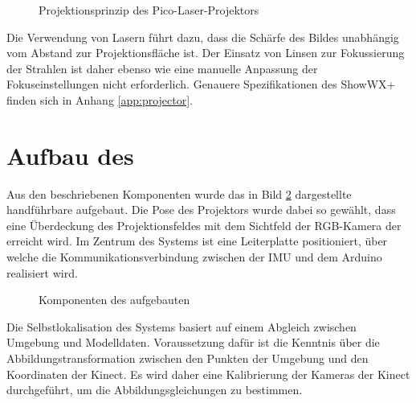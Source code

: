 
\begin{figure}[ht]
	\begin{center}
		\caption{Projektionsprinzip des Pico-Laser-Projektors}
		\label{fig.projtech}
	\end{center}
\end{figure}

\prever{
}

Die Verwendung von Lasern führt dazu, dass die Schärfe des Bildes unabhängig vom Abstand zur Projektionsfläche ist. Der Einsatz von Linsen zur Fokussierung der Strahlen ist daher ebenso wie eine manuelle Anpassung der Fokuseinstellungen nicht erforderlich. Genauere Spezifikationen des ShowWX+\textsuperscript{\texttrademark} finden sich in Anhang \ref{app:projector}.

\section{Aufbau des }
Aus den beschriebenen Komponenten wurde das in Bild \ref{fig.kinpro} dargestellte handführbare \kps{} aufgebaut. Die Pose des Projektors wurde dabei so gewählt, dass eine Überdeckung des Projektionsfeldes mit dem Sichtfeld der RGB-Kamera der \kin erreicht wird. Im Zentrum des Systems ist eine Leiterplatte positioniert, über welche die Kommunikationsverbindung zwischen der IMU und dem Arduino realisiert wird.

\begin{figure}[ht]
	\begin{center}%
		\caption{Komponenten des aufgebauten }
		\label{fig.kinpro}
	\end{center}
\end{figure}

Die Selbstlokalisation des Systems basiert auf einem Abgleich zwischen Umgebung und Modelldaten. Voraussetzung dafür ist die Kenntnis über die Abbildungstransformation zwischen den Punkten der Umgebung und den Koordinaten der Kinect. Es wird daher eine Kalibrierung der Kameras der Kinect durchgeführt, um die Abbildungsgleichungen zu bestimmen.\\

